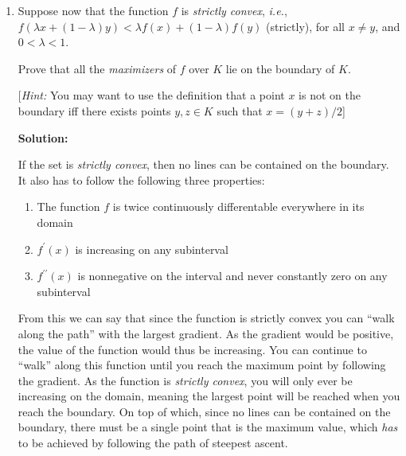 \documentclass[12pt]{article}
\newcommand{\inner}[2]{\left< #1 , #2\right>}
\newcommand{\grad}{\nabla}
\begin{document}
\begin{enumerate}
\begin{enumerate}
      {\bf Solution:}

Given the following in the above equation

\begin{align*}
\inner{\nabla f(x)}{x - x^{*}} &> 0\\
\intertext{If a function is convex, then we have the following is greater than or equal to the previous. As it is greater than or equal to, we can leave the greater than sign}
f(x^{*}) - f(x) &> 0\\
\intertext{In order to minimize, we need to take the gradient, giving}
\grad f(x^{*}) - \grad f(x) &> 0\\
\intertext{If $x^{*}$ is the minimizer, then the gradient is zero, giving}
-\grad f(x) &> 0\\
\intertext{If $f$ is a convex function, then any point $x \neq x^{*}$ has a negative slope/gradient, meaning the above holds true, thus proving the proposed statement.}
\end{align*}


    \item Suppose now that the function $f$ is {\em strictly convex}, {\em i.e.}, $f(\lambda x + (1 - \lambda)y) < \lambda f(x) + (1 - \lambda) f(y)$ (strictly), for all $x \neq y$, and $0 < \lambda < 1$. 

Prove that all the {\em maximizers} of $f$ over $K$ lie on the boundary of $K$. 

[{\em Hint:} You may want to use the definition that a point $x$ is not on the boundary iff there exists points $y,z \in K$ such that $x = (y+z)/2$]

      {\bf Solution:}

If the set is {\em strictly convex}, then no lines can be contained on the boundary. It also has to follow the following three properties:

\begin{enumerate}
  \item The function $f$ is twice continuously differentable everywhere in its domain
  \item $f^{\prime}(x)$ is increasing on any subinterval
  \item $f^{\prime\prime}(x)$ is nonnegative on the interval and never constantly zero on any subinterval
\end{enumerate}

From this we can say that since the function is strictly convex you can ``walk along the path'' with the largest gradient. As the gradient would be positive, the value of the function would thus be increasing. You can continue to ``walk'' along this function until you reach the maximum point by following the gradient. As the function is {\em strictly convex}, you will only ever be increasing on the domain, meaning the largest point will be reached when you reach the boundary. On top of which, since no lines can be contained on the boundary, there must be a single point that is the maximum value, which {\em has} to be achieved by following the path of steepest ascent. 


\end{enumerate}
\end{enumerate}
\end{document}
